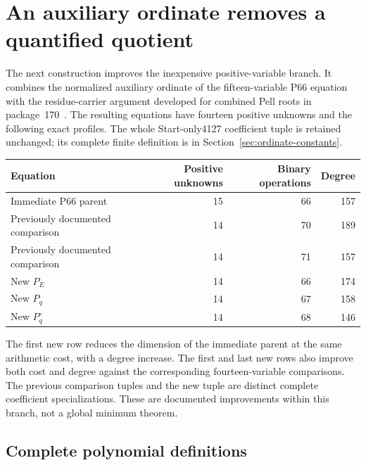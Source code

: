 \section{An auxiliary ordinate removes a quantified quotient}\label{sec:ordinate}

The next construction improves the inexpensive positive-variable branch.
It combines the normalized auxiliary ordinate of the fifteen-variable
P66 equation~\cite{proveit174} with the residue-carrier argument developed
for combined Pell roots in package~170~\cite{proveit170}. The resulting
equations have fourteen positive unknowns and the following exact profiles.
The whole Start-only4127 coefficient tuple is retained unchanged; its
complete finite definition is in Section~\ref{sec:ordinate-constants}.

\begin{center}
\begin{tabular}{lrrr}
\toprule
Equation & Positive unknowns & Binary operations & Degree\\
\midrule
Immediate P66 parent &15&66&157\\
Previously documented comparison &14&70&189\\
Previously documented comparison &14&71&157\\
New $P_E$ &14&66&174\\
New $P_q$ &14&67&158\\
New $P_q^{\circ}$ &14&68&146\\
\bottomrule
\end{tabular}
\end{center}

The first new row reduces the dimension of the immediate parent at the same
arithmetic cost, with a degree increase. The first and last new rows also
improve both cost and degree against the corresponding fourteen-variable
comparisons. The previous comparison tuples and the new tuple are distinct
complete coefficient specializations. These are documented improvements
within this branch, not a global minimum theorem.

\subsection{Complete polynomial definitions}

